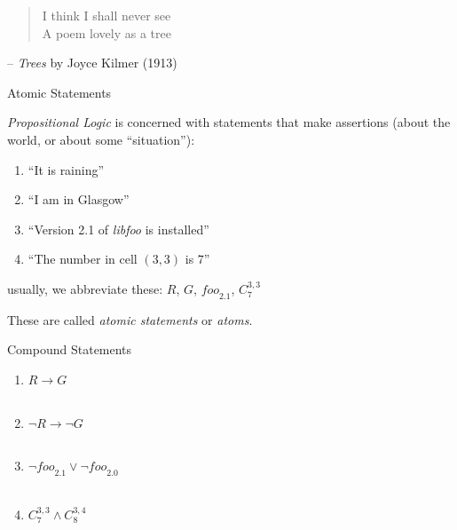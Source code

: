 \documentclass[xetex,aspectratio=169,14pt,hyperref={pdfpagelabels=true,pdflang={en-GB}}]{beamer}
\begin{document}
\frame{\titlepage}


\begin{frame}
  \begin{quotation}
    I think I shall never see \\
    A poem lovely as a tree
  \end{quotation}

  \raggedleft
  -- \emph{Trees} by Joyce Kilmer (1913)

\end{frame}

\begin{frame}
  {Atomic Statements}

  \emph{Propositional Logic} is concerned with statements that make
  assertions (about the world, or about some ``situation''):
  \begin{enumerate}
  \item ``It is raining''
  \item ``I am in Glasgow''
  \item ``Version 2.1 of \emph{libfoo} is installed''
  \item ``The number in cell $(3,3)$ is $7$''
  \end{enumerate}
  usually, we abbreviate these: $R$, $G$, $\mathit{foo}_{2.1}$, $C^{3,3}_7$

  \medskip

  These are called \emph{atomic statements} or \emph{atoms}.
\end{frame}

\begin{frame}
  {Compound Statements}

  \begin{enumerate}
  \item $R \to G$ \\  \\
    \medskip
  \item $\lnot R \to \lnot G$ \\  \\
    \medskip
  \item $\lnot\mathit{foo}_{2.1} \lor \lnot\mathit{foo}_{2.0}$\\
     \\
    \medskip
  \item $C^{3,3}_7 \land C^{3,4}_8$\\
  \end{enumerate}
\end{frame}
\end{document}
